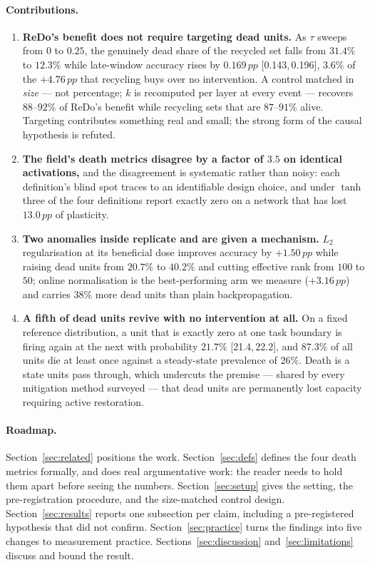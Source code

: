 \documentclass[10pt]{article}
\newcommand{\pp}{\,pp}
\newcommand{\ci}[2]{{\footnotesize[#1,\,#2]}}
\begin{document}
\paragraph{Contributions.}
\begin{enumerate}
\item \textbf{ReDo's benefit does not require targeting dead units.} As $\tau$
sweeps from $0$ to $0.25$, the genuinely dead share of the recycled set falls
from $31.4\%$ to $12.3\%$ while late-window accuracy rises by $0.169\pp$
\ci{0.143}{0.196}, $3.6\%$ of the $+4.76\pp$ that recycling buys over no
intervention. A control matched in \emph{size} --- not percentage; $k$ is
recomputed per layer at every event --- recovers $88$--$92\%$ of ReDo's benefit
while recycling sets that are $87$--$91\%$ alive. Targeting contributes
something real and small; the strong form of the causal hypothesis is refuted.

\item \textbf{The field's death metrics disagree by a factor of $3.5$ on
identical activations,} and the disagreement is systematic rather than noisy:
each definition's blind spot traces to an identifiable design choice, and under
$\tanh$ three of the four definitions report exactly zero on a network that has
lost $13.0\pp$ of plasticity.

\item \textbf{Two anomalies inside \citet{dohare2024loss} replicate and are given
a mechanism.} $L_2$ regularisation at its beneficial dose improves accuracy by
$+1.50\pp$ while raising dead units from $20.7\%$ to $40.2\%$ and cutting
effective rank from $100$ to $50$; online normalisation
\citep{chiley2019online} is the best-performing arm we measure ($+3.16\pp$) and
carries $38\%$ more dead units than plain backpropagation.

\item \textbf{A fifth of dead units revive with no intervention at all.} On a
fixed reference distribution, a unit that is exactly zero at one task boundary is
firing again at the next with probability $21.7\%$ \ci{21.4}{22.2}, and $87.3\%$
of all units die at least once against a steady-state prevalence of $26\%$. Death
is a state units pass through, which undercuts the premise --- shared by every
mitigation method surveyed --- that dead units are permanently lost capacity
requiring active restoration.
\end{enumerate}

\paragraph{Roadmap.} Section~\ref{sec:related} positions the work.
Section~\ref{sec:defs} defines the four death metrics formally, and does real
argumentative work: the reader needs to hold them apart before seeing the
numbers. Section~\ref{sec:setup} gives the setting, the pre-registration
procedure, and the size-matched control design. Section~\ref{sec:results}
reports one subsection per claim, including a pre-registered hypothesis that did
not confirm. Section~\ref{sec:practice} turns the findings into five changes to
measurement practice. Sections~\ref{sec:discussion} and~\ref{sec:limitations}
discuss and bound the result.
\end{document}
